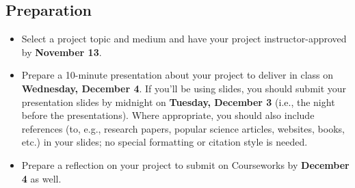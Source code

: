 \documentclass[11pt]{article}
\begin{document}
\subsection*{Preparation}
\begin{itemize}[noitemsep]
    \item Select a project topic and medium and have your project instructor-approved by \textbf{November 13}.
    \item Prepare a 10-minute presentation about your project to deliver in class on \textbf{Wednesday, December 4}. If you'll be using slides, you should submit your presentation slides by midnight on \textbf{Tuesday, December 3} (i.e., the night before the presentations). Where appropriate, you should also include references (to, e.g., research papers, popular science articles, websites, books, etc.) in your slides; no special formatting or citation style is needed.
    \item Prepare a reflection on your project to submit on Courseworks by \textbf{December 4} as well.
\end{itemize}
\end{document}
